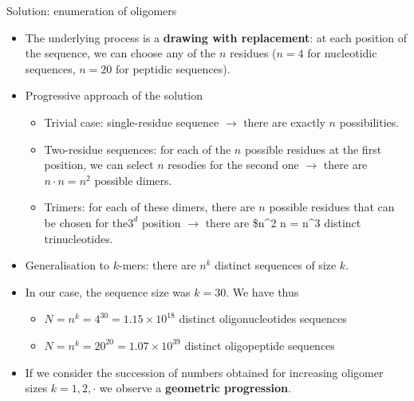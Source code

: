 \documentclass[ignorenonframetext,]{beamer}
\providecommand{\tightlist}{%
  \setlength{\itemsep}{0pt}\setlength{\parskip}{0pt}}
\begin{document}
\begin{frame}{Solution: enumeration of oligomers}
\protect\hypertarget{solution-enumeration-of-oligomers}{}

\begin{itemize}
\item
  The underlying process is a \textbf{drawing with replacement}: at each
  position of the sequence, we can choose any of the \(n\) residues
  (\(n=4\) for nucleotidic sequences, \(n=20\) for peptidic sequences).
\item
  Progressive approach of the solution

  \begin{itemize}
  \item
    Trivial case: single-residue sequence \(\rightarrow\) there are
    exactly \(n\) possibilities.
  \item
    Two-residue sequences: for each of the \(n\) possible residues at
    the first position, we can select \(n\) resodies for the second one
    \(\rightarrow\) there are \(n \cdot n = n^2\) possible dimers.
  \item
    Trimers: for each of these dimers, there are \(n\) possible residues
    that can be chosen for the\(3^{d}\) position \(\rightarrow\) there
    are \$n\^{}2 \cdot n = n\^{}3 distinct trinucleotides.
  \end{itemize}
\item
  Generalisation to \(k\)-mers: there are \(n^k\) distinct sequences of
  size \(k\).
\item
  In our case, the sequence size was \(k=30\). We have thus

  \begin{itemize}
  \tightlist
  \item
    \(N = n^k = 4^{30} = \ensuremath{1.15\times 10^{18}}\) distinct
    oligonucleotides sequences
  \item
    \(N = n^k = 20^{20} = \ensuremath{1.07\times 10^{39}}\) distinct
    oligopeptide sequences
  \end{itemize}
\item
  If we consider the succession of numbers obtained for increasing
  oligomer sizes \(k=1, 2, \cdot\) we observe a \textbf{geometric
  progression}.
\end{itemize}

\end{frame}
\end{document}
